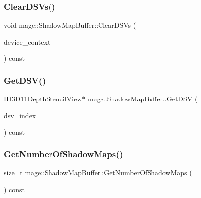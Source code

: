 \hypertarget{structmage_1_1_shadow_map_buffer_a927a344ebb5ffeb2a6026db662708a9c}{}\label{structmage_1_1_shadow_map_buffer_a927a344ebb5ffeb2a6026db662708a9c} 
\subsubsection{\texorpdfstring{Clear\+D\+S\+Vs()}{ClearDSVs()}}
{\footnotesize\ttfamily void mage\+::\+Shadow\+Map\+Buffer\+::\+Clear\+D\+S\+Vs (\begin{DoxyParamCaption}\item[{I\+D3\+D11\+Device\+Context2 $\ast$}]{device\+\_\+context }\end{DoxyParamCaption}) const\hspace{0.3cm}{\ttfamily [noexcept]}}

\hypertarget{structmage_1_1_shadow_map_buffer_a8762dcdaca36c7a206dac362d387f0f1}{}\label{structmage_1_1_shadow_map_buffer_a8762dcdaca36c7a206dac362d387f0f1} 
\subsubsection{\texorpdfstring{Get\+D\+S\+V()}{GetDSV()}}
{\footnotesize\ttfamily I\+D3\+D11\+Depth\+Stencil\+View$\ast$ mage\+::\+Shadow\+Map\+Buffer\+::\+Get\+D\+SV (\begin{DoxyParamCaption}\item[{size\+\_\+t}]{dsv\+\_\+index }\end{DoxyParamCaption}) const\hspace{0.3cm}{\ttfamily [noexcept]}}

\hypertarget{structmage_1_1_shadow_map_buffer_ab0b78c26663aa303d8f72dc89ec25eea}{}\label{structmage_1_1_shadow_map_buffer_ab0b78c26663aa303d8f72dc89ec25eea} 
\subsubsection{\texorpdfstring{Get\+Number\+Of\+Shadow\+Maps()}{GetNumberOfShadowMaps()}}
{\footnotesize\ttfamily size\+\_\+t mage\+::\+Shadow\+Map\+Buffer\+::\+Get\+Number\+Of\+Shadow\+Maps (\begin{DoxyParamCaption}{ }\end{DoxyParamCaption}) const\hspace{0.3cm}{\ttfamily [noexcept]}}

